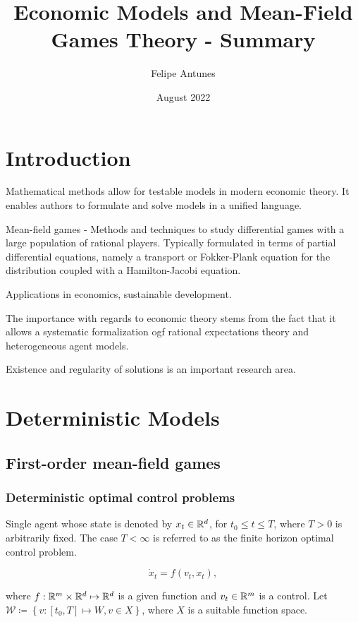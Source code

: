 \documentclass{article}
\title{Economic Models and Mean-Field Games Theory - Summary}
\author{Felipe Antunes}
\date{August 2022}
\begin{document}
\maketitle
\section{Introduction}
Mathematical methods allow for testable models in modern economic theory. It enables authors to formulate and solve models in a unified language.

Mean-field games - Methods and techniques to study differential games with a large population of rational players. Typically formulated in terms of partial differential equations, namely a transport or Fokker-Plank equation for the distribution coupled with a Hamilton-Jacobi equation.

Applications in economics, sustainable development.

The importance with regards to economic theory stems from the fact that it allows a systematic formalization ogf rational expectations theory and heterogeneous agent models.

Existence and regularity of solutions is an important research area.


\section{Deterministic Models}

\subsection{First-order mean-field games}

\subsubsection{Deterministic optimal control problems}\label{deterministic_optimal_control}

Single agent whose state is denoted by $x_t \in \mathbb{R}^d$, for $t_0 \leq t\leq T$, where $T > 0$ is arbitrarily fixed. The case $T< \infty$ is referred to as the finite horizon optimal control problem.

$$\dot x_t = f(v_t,x_t),$$

where $f: \mathbb{R}^m \times \mathbb{R}^d \mapsto \mathbb{R}^d$ is a given function and $v_t \in \mathbb{R}^m$ is a control. Let $\mathcal{W} \coloneqq \left\{ v : [t_0, T] \mapsto W, v \in X \right\}$, where $X$ is a suitable function space.
\end{document}
